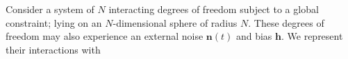 Consider a system of $N$ interacting degrees of freedom subject to a global constraint; lying on an $N$-dimensional sphere of radius $N$. These degrees of freedom may also experience an external noise $\mathbf{n}(t)$ and bias $\mathbf{h}$. We represent their interactions with